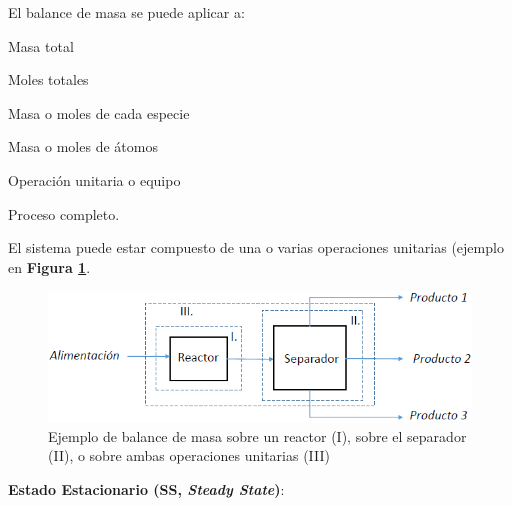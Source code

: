             El balance de masa se puede aplicar a:
            
            \begin{enumerate}
                \begin{minipage}{0.2\linewidth}
                    \item Masa total
                    \item Moles totales
                \end{minipage}
                \begin{minipage}{0.4\linewidth}
                    \item Masa o moles de cada especie
                    \item Masa o moles de átomos
                \end{minipage}
                \begin{minipage}{0.3\linewidth}
                    \item Operación unitaria o equipo
                    \item Proceso completo.
                \end{minipage}
            \end{enumerate}
            
            El sistema puede estar compuesto de una o varias operaciones unitarias (ejemplo en \textbf{Figura \ref{fig:balance_masa_ej}}.
            
            \begin{figure}
                \centering
                \includegraphics[width=.9\textwidth]{img/esquemas/balance_masa_ej.png}
                \caption[Ejemplo de balance de masa]{Ejemplo de balance de masa sobre un reactor (I), sobre el separador (II), o sobre ambas operaciones unitarias (III)}
                \label{fig:balance_masa_ej}
            \end{figure}
            
            
            \textbf{Estado Estacionario (SS, \textit{Steady State})}:
            
